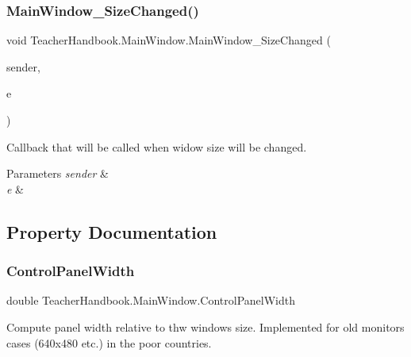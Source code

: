 \subsubsection{\texorpdfstring{Main\+Window\+\_\+\+Size\+Changed()}{MainWindow\_SizeChanged()}}
{\footnotesize\ttfamily void Teacher\+Handbook.\+Main\+Window.\+Main\+Window\+\_\+\+Size\+Changed (\begin{DoxyParamCaption}\item[{object}]{sender,  }\item[{Size\+Changed\+Event\+Args}]{e }\end{DoxyParamCaption})\hspace{0.3cm}{\ttfamily [private]}}



Callback that will be called when widow size will be changed. 


\begin{DoxyParams}{Parameters}
{\em sender} & \\
\hline
{\em e} & \\
\hline
\end{DoxyParams}


\subsection{Property Documentation}
\mbox{\label{class_teacher_handbook_1_1_main_window_ad5d35ace4162888ef660d19eb3990626}} 
\subsubsection{\texorpdfstring{Control\+Panel\+Width}{ControlPanelWidth}}
{\footnotesize\ttfamily double Teacher\+Handbook.\+Main\+Window.\+Control\+Panel\+Width\hspace{0.3cm}{\ttfamily [get]}}



Compute panel width relative to thw window\textquotesingle{}s size. Implemented for old monitors\textquotesingle{} cases (640x480 etc.) in the poor countries. 

\mbox{\label{class_teacher_handbook_1_1_main_window_ada9d7a71ad01c470b09f6c62bf2afb7c}} 

